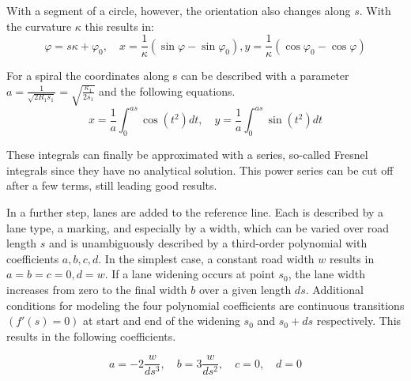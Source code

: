 \documentclass[a4paper, 10pt, conference]{ieeeconf}      %
\begin{document}
    With a segment of a circle, however, the orientation also changes along \(s\). With the curvature \(\kappa\) this results in:
    \begin{equation}
        \varphi = s  \kappa + \varphi_0, \quad x = \frac{1}{\kappa} \left(\sin\varphi - \sin\varphi_0 \right),  y = \frac{1}{\kappa} \left(\cos\varphi_0 - \cos\varphi \right) 
    \end{equation} 

    For a spiral the coordinates along s can be described with a parameter \(a = \frac{1}{\sqrt{2R_1s_1}} = \sqrt{\frac{\kappa_1}{2s_1}}\) and the following equations. 
    \begin{equation} 
        x = \frac{1}{a}\int_0^{as}  \cos\left(t^2\right)dt, \quad y = \frac{1}{a}\int_0^{as}  \sin\left(t^2\right)dt 
    \end{equation}

    These integrals can finally be approximated with a series, so-called Fresnel integrals since they have no analytical solution. This power series can be cut off after a few terms, still leading good results.

    In a further step, lanes are added to the reference line. Each is described by a lane type, a marking, and especially by a width, which can be varied over road length \(s\) and is unambiguously described by a third-order polynomial with coefficients \(a,b,c,d\). In the simplest case, a constant road width \(w\) results in \(a=b=c=0, d=w\). If a lane widening occurs at point \(s_0\), the lane width increases from zero to the final width \(b\) over a given length \(ds\). Additional conditions for modeling the four polynomial coefficients are continuous transitions \(\left(f'(s) = 0\right)\) at start and end of the widening \(s_0\) and \(s_0 + ds\) respectively. This results in the following coefficients.

    \begin{equation}
        a = -2\frac{w}{ds^3}, \quad b=3 \frac{w}{ds^2}, \quad c=0 , \quad d=0   
    \end{equation}
        
\end{document}
